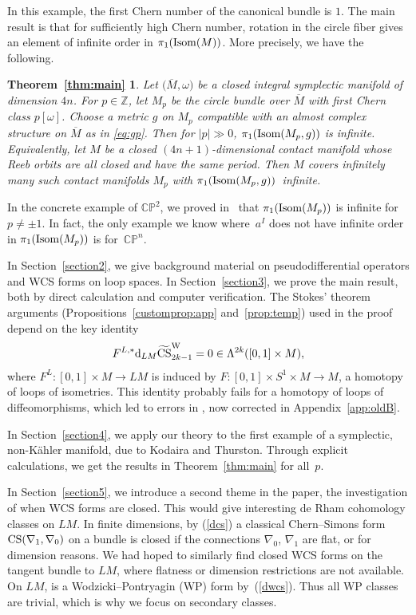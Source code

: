 \documentclass[pdftex]{sigma}
\numberwithin{equation}{section}
\newtheorem*{TheoremMain}{Theorem~\ref{thm:main}}
\theoremstyle{definition}
\newcommand{\BbP}{{\mathbb P}}
\newcommand{\BbC}{{\mathbb C}}
\newcommand{\BbZ}{{\mathbb Z}}
\newcommand{\Z}{\BbZ}
\newcommand{\bm}{ M}
\newcommand{\ocs}{\widetilde{{\rm CS}}}
\newcommand{\om}{\overline{M}}
\newcommand{\omp}{M_p}
\newcommand{\isom}{{\rm Isom}}
\newcommand{\isombm}{\isom(\bm)}
\begin{document}
In this example, the first Chern number of the canonical bundle is $1$.
The main result is that for sufficiently high Chern number, rotation in the circle fiber gives an element of infinite order in $\pi_1(\isombm)$. More precisely, we have the following.

\begin{TheoremMain}
Let $\bigl(\om,\omega\bigr)$ be a closed integral symplectic manifold of dimension $4n$. For $p\in \Z$, let $\omp$ be the circle bundle over $\om$ with first Chern class $p[\omega]$. Choose a metric $g$ on $\omp$ compatible with an almost complex structure on $\om$ as in \eqref{eq:gp}. Then for $|p| \gg 0 $,
 $\pi_1(\isom(\omp,g))$ is
infinite. Equivalently, let $M$ be a closed $(4n+1)$-dimensional contact manifold whose Reeb orbits are all closed and have the same period. Then $M$ covers infinitely many such contact manifolds $\omp$ with
$\pi_1({\rm Isom}(\omp,g))$~infinite.
\end{TheoremMain}

In the concrete example of $\BbC\BbP^{2}$, we proved in~\cite{MRT4} that $\pi_1(\isom(\omp))$ is infinite for
$p\neq \pm1$. In fact, the only example we know where~$a^I$ does not have infinite order in $\pi_1({\rm Isom}(\omp))$ is for~$\BbC\BbP^{n}$.

In Section~\ref{section2}, we give background material on pseudodifferential operators and WCS forms on
loop spaces. In Section~\ref{section3}, we prove the main result, both by direct calculation and computer verification.
The Stokes' theorem arguments (Propositions~\ref{customprop:app} and~\ref{prop:temp}) used in the proof depend on the key identity
\begin{equation} \label{eq:intro}
F^{L,*}{\rm d}_{LM}\ocs^{\rm W}_{2k-1} = 0\in \Lambda^{2k}([0,1]\times M),
\end{equation}
where $F^L\colon [0,1] \times M \to LM$ is induced by $F\colon [0,1]\times S^1\times M\to M$, a homotopy of loops of isometries. This identity probably fails for a homotopy of loops of diffeomorphisms, which led to errors in \cite{MRT4}, now corrected in Appendix~\ref{app:oldB}.

In Section~\ref{section4}, we apply our theory to the first example of a symplectic, non-K\"ahler manifold, due to Kodaira and Thurston. Through explicit calculations, we get the results in Theorem~\ref{thm:main} for all~$p$.

In Section~\ref{section5},
we introduce a second theme in the paper, the investigation of when WCS forms are closed. This would give interesting de Rham cohomology classes on $LM$. In finite dimensions, by (\ref{dcs}) a classical Chern--Simons form ${\rm CS}(\nabla_1, \nabla_0)$ on a bundle is closed if the connections $\nabla_0$, $\nabla_1$ are flat, or for dimension reasons. We had hoped to similarly find closed WCS forms on the tangent bundle to $LM$, where flatness or dimension restrictions are not available.
 On $LM$, \smash{$ {\rm d}_{LM}\ocs{}^{\rm W}_{2k-1}$} is a Wodzicki--Pontryagin (WP) form by~(\ref{dwcs}). Thus all WP
 classes are trivial, which is why we focus on secondary classes.
\end{document}
